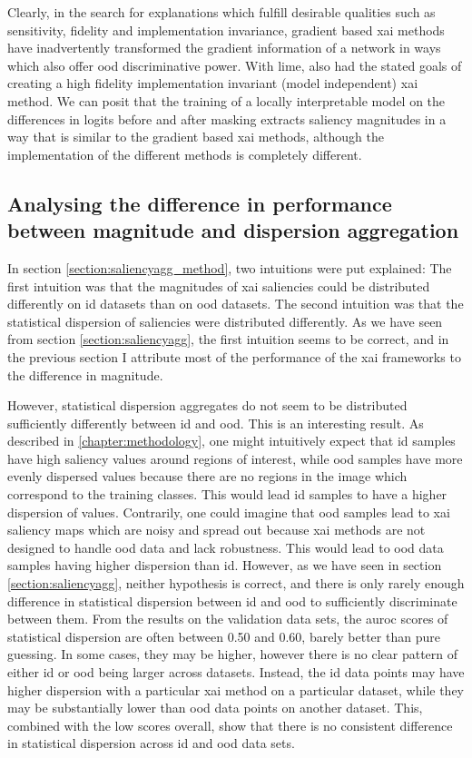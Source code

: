 \documentclass[UKenglish]{uiomasterthesis} %
\theoremstyle{definition}
\begin{document}
Clearly, in the search for explanations which fulfill desirable qualities such as sensitivity, fidelity and implementation invariance, gradient based \ac{xai} methods have inadvertently transformed the gradient information of a network in ways which also offer \ac{ood} discriminative power. With \ac{lime}, \cite{lime} also had the stated goals of creating a high fidelity implementation invariant (model independent) \ac{xai} method. We can posit that the training of a locally interpretable model on the differences in logits before and after masking extracts saliency magnitudes in a way that is similar to the gradient based \ac{xai} methods, although the implementation of the different methods is completely different.

\subsection{Analysing the difference in performance between magnitude and dispersion aggregation}

In section \ref{section:saliencyagg_method}, two intuitions were put explained: The first intuition was that the magnitudes of \ac{xai} saliencies could be distributed differently on \ac{id} datasets than on \ac{ood} datasets. The second intuition was that the statistical dispersion of saliencies were distributed differently. As we have seen from section \ref{section:saliencyagg}, the first intuition seems to be correct, and in the previous section I attribute most of the performance of the \ac{xai} frameworks to the difference in magnitude.

However, statistical dispersion aggregates do not seem to be distributed sufficiently differently between \ac{id} and \ac{ood}. This is an interesting result. As described in \ref{chapter:methodology}, one might intuitively expect that \ac{id} samples have high saliency values around regions of interest, while \ac{ood} samples have more evenly dispersed values because there are no regions in the image which correspond to the training classes. This would lead \ac{id} samples to have a higher dispersion of values. Contrarily, one could imagine that \ac{ood} samples lead to \ac{xai} saliency maps which are noisy and spread out because \ac{xai} methods are not designed to handle \ac{ood} data and lack robustness. This would lead to \ac{ood} data samples having higher dispersion than \ac{id}. However, as we have seen in section \ref{section:saliencyagg}, neither hypothesis is correct, and there is only rarely enough difference in statistical dispersion between \ac{id} and \ac{ood} to sufficiently discriminate between them. From the results on the validation data sets, the \ac{auroc} scores of statistical dispersion are often between 0.50 and 0.60, barely better than pure guessing. In some cases, they may be higher, however there is no clear pattern of either \ac{id} or \ac{ood} being larger across datasets. Instead, the \ac{id} data points may have higher dispersion with a particular \ac{xai} method on a particular dataset, while they may be substantially lower than \ac{ood} data points on another dataset. This, combined with the low scores overall, show that there is no consistent difference in statistical dispersion across \ac{id} and \ac{ood} data sets.
\end{document}
